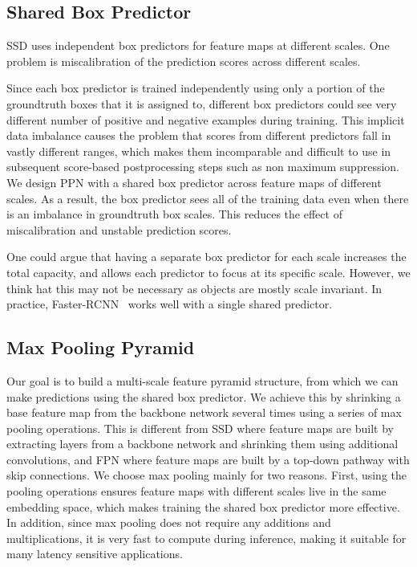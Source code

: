 \documentclass[10pt,twocolumn,letterpaper]{article}
\begin{document}
\subsection{Shared Box Predictor}
SSD uses independent box predictors for feature maps at different scales.
One problem is miscalibration of the prediction scores across different scales.

Since each box predictor is trained independently using only
a portion of the groundtruth boxes that it is assigned to,
different box predictors could see very different number of
positive and negative examples during training.  This
implicit data imbalance causes the problem that scores
from different predictors fall in vastly different ranges,
which makes them incomparable and difficult to use in
subsequent score-based postprocessing steps such as non maximum
suppression.  We design PPN with a shared box predictor
across feature maps of different scales.  As a result, the
box predictor sees all of the training data even when
there is an imbalance in groundtruth box scales. This reduces
the effect of miscalibration and unstable prediction scores.

One could argue that having a separate box predictor for each
scale increases the total capacity, and allows each
predictor to focus at its specific scale. However, we think
hat this may not be necessary as objects are mostly scale
invariant. In practice, Faster-RCNN~\cite{ren2015frcnn}
works well with a single shared predictor.


\subsection{Max Pooling Pyramid}

Our goal is to build a multi-scale feature pyramid
structure, from which we can make predictions using the
shared box predictor.  We achieve this by shrinking a
base feature map from the backbone network several times
using a series of max pooling operations.  This is different
from SSD where feature maps are built by extracting layers
from a backbone network and shrinking them using additional
convolutions, and FPN where feature maps are built by a
top-down pathway with skip connections.  We choose max
pooling mainly for two reasons.  First, using the pooling
operations ensures feature maps with different scales live
in the same embedding space, which makes training the shared
box predictor more effective.  In addition, since max
pooling does not require any additions and multiplications,
it is very fast to compute during inference,
making it suitable for many latency sensitive applications.
\end{document}
